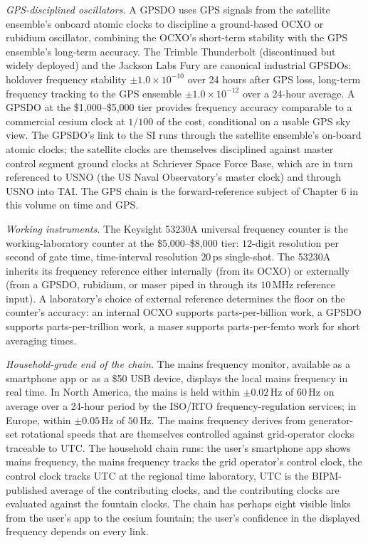 \textit{GPS-disciplined oscillators.} A GPSDO uses GPS signals from
the satellite ensemble's onboard atomic clocks to discipline a
ground-based OCXO or rubidium oscillator, combining the OCXO's
short-term stability with the GPS ensemble's long-term accuracy.
The Trimble Thunderbolt (discontinued but widely deployed)
\cite{web:ch03t3-trimble-thunderbolt} and the Jackson Labs Fury
\cite{web:ch03t3-jackson-labs-fury} are canonical industrial
GPSDOs: holdover frequency stability $\pm 1.0 \times 10^{-10}$
over 24 hours after GPS loss, long-term frequency tracking to the
GPS ensemble $\pm 1.0 \times 10^{-12}$ over a 24-hour average.
A GPSDO at the \$1{,}000--\$5{,}000 tier provides frequency
accuracy comparable to a commercial cesium clock at $1/100$ of
the cost, conditional on a usable GPS sky view. The GPSDO's link
to the SI runs through the satellite ensemble's on-board atomic
clocks; the satellite clocks are themselves disciplined against
master control segment ground clocks at Schriever Space Force Base,
which are in turn referenced to USNO (the US Naval Observatory's
master clock) and through USNO into TAI. The GPS chain is the
forward-reference subject of Chapter 6 in this volume on time and
GPS.

\textit{Working instruments.} The Keysight 53230A universal
frequency counter \cite{web:ch03t3-keysight-53230a} is the
working-laboratory counter at the \$5{,}000--\$8{,}000 tier:
$12$-digit resolution per second of gate time, time-interval
resolution $20 \,\si{\pico\second}$ single-shot. The 53230A
inherits its frequency reference either internally (from its
OCXO) or externally (from a GPSDO, rubidium, or maser piped in
through its $10 \,\si{\mega\hertz}$ reference input). A
laboratory's choice of external reference determines the floor on
the counter's accuracy: an internal OCXO supports parts-per-billion
work, a GPSDO supports parts-per-trillion work, a maser supports
parts-per-femto work for short averaging times.

\textit{Household-grade end of the chain.} The mains frequency
monitor, available as a smartphone app or as a \$50 USB device,
displays the local mains frequency in real time. In North America,
the mains is held within $\pm 0.02 \,\si{\hertz}$ of $60 \,\si{
\hertz}$ on average over a 24-hour period by the
ISO/RTO frequency-regulation services; in Europe, within
$\pm 0.05 \,\si{\hertz}$ of $50 \,\si{\hertz}$. The mains
frequency derives from generator-set rotational speeds that are
themselves controlled against grid-operator clocks traceable to
UTC. The household chain runs: the user's smartphone app shows
mains frequency, the mains frequency tracks the grid operator's
control clock, the control clock tracks UTC at the regional time
laboratory, UTC is the BIPM-published average of the contributing
clocks, and the contributing clocks are evaluated against the
fountain clocks. The chain has perhaps eight visible links from
the user's app to the cesium fountain; the user's confidence in
the displayed frequency depends on every link.

